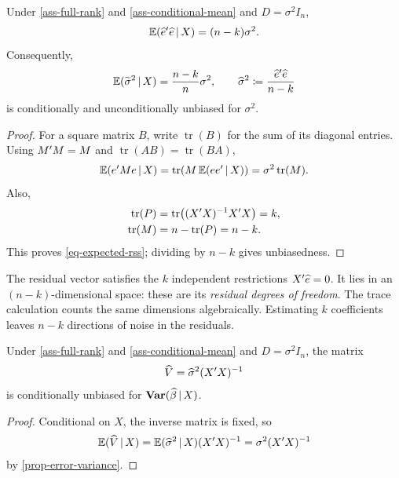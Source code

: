 \documentclass[a4paper,12pt]{article}
\begin{document}
\begin{proposition}\label{prop-error-variance}
	Under \autoref{ass-full-rank} and \ref{ass-conditional-mean} and $D=\sigma^2 I_n$,
	\begin{align}\label{eq-expected-rss}
		\operatorname{\mathbb{E}}(\widehat e^{\prime}\widehat e\mathpunct{}|\mathpunct{} X)=(n-k)\sigma^2.
	\end{align}
	Consequently,
	\begin{align}
		\operatorname{\mathbb{E}}(\widetilde\sigma^2\mathpunct{}|\mathpunct{} X)=\frac{n-k}{n}\sigma^2,
		\qquad
		\widehat\sigma^2\coloneqq\frac{\widehat e^{\prime}\widehat e}{n-k}
	\end{align}
	is conditionally and unconditionally unbiased for $\sigma^2$.
\end{proposition}
\begin{proof}
	For a square matrix $B$, write $\operatorname{tr}(B)$ for the sum of its diagonal entries.
	Using $M^{\prime} M=M$ and $\operatorname{tr}(AB)=\operatorname{tr}(BA)$,
	\begin{align*}
		\operatorname{\mathbb{E}}(e^{\prime} M e\mathpunct{}|\mathpunct{} X)
		=\operatorname{tr}\!\left(M\operatorname{\mathbb{E}}(ee^{\prime}\mathpunct{}|\mathpunct{} X)\right)
		=\sigma^2\operatorname{tr}(M).
	\end{align*}
	Also,
	\begin{align*}
		\operatorname{tr}(P)
		&=\operatorname{tr}\!\left((X^{\prime} X)^{-1} X^{\prime} X\right)=k,\\
		\operatorname{tr}(M)&=n-\operatorname{tr}(P)=n-k.
	\end{align*}
	This proves \eqref{eq-expected-rss}; dividing by $n-k$ gives unbiasedness.
\end{proof}

\begin{remark}
	The residual vector satisfies the $k$ independent restrictions $X^{\prime}\widehat e=0$.
	It lies in an $(n-k)$-dimensional space: these are its \emph{residual degrees of freedom}.
	The trace calculation counts the same dimensions algebraically.
	Estimating $k$ coefficients leaves $n-k$ directions of noise in the residuals.
\end{remark}

\begin{proposition}
	Under \autoref{ass-full-rank} and \ref{ass-conditional-mean} and $D=\sigma^2 I_n$, the matrix
	\begin{align}
		\widehat V=\widehat\sigma^2(X^{\prime} X)^{-1}
	\end{align}
	is conditionally unbiased for $\operatorname{\text{\textrm{\upshape\textbf{Var}}}}(\widehat\beta\mathpunct{}|\mathpunct{} X)$.
\end{proposition}
\begin{proof}
	Conditional on $X$, the inverse matrix is fixed, so
	\begin{align*}
		\operatorname{\mathbb{E}}(\widehat V\mathpunct{}|\mathpunct{} X)
		= \operatorname{\mathbb{E}}(\widehat\sigma^2\mathpunct{}|\mathpunct{} X)(X^{\prime} X)^{-1}
		= \sigma^2(X^{\prime} X)^{-1}
	\end{align*}
	by \autoref{prop-error-variance}.
\end{proof}
\end{document}
